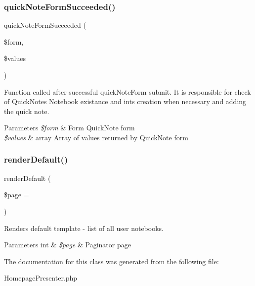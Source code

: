 \subsubsection{\texorpdfstring{quick\+Note\+Form\+Succeeded()}{quickNoteFormSucceeded()}}
{\footnotesize\ttfamily quick\+Note\+Form\+Succeeded (\begin{DoxyParamCaption}\item[{}]{\$form,  }\item[{}]{\$values }\end{DoxyParamCaption})}

Function called after successful quick\+Note\+Form submit. It is responsible for check of Quick\+Notes Notebook existance and int\textquotesingle{}s creation when necessary and adding the quick note.


\begin{DoxyParams}{Parameters}
{\em \$form} & Form Quick\+Note form \\
\hline
{\em \$values} & array Array of values returned by Quick\+Note form \\
\hline
\end{DoxyParams}
\mbox{\label{class_app_1_1_presenters_1_1_homepage_presenter_a7824b03de268f5968857a8ea1b23abe0}} 
\subsubsection{\texorpdfstring{render\+Default()}{renderDefault()}}
{\footnotesize\ttfamily render\+Default (\begin{DoxyParamCaption}\item[{}]{\$page = {} }\end{DoxyParamCaption})}

Renders default template -\/ list of all user notebooks.


\begin{DoxyParams}[1]{Parameters}
int & {\em \$page} & Paginator page \\
\hline
\end{DoxyParams}


The documentation for this class was generated from the following file\+:\begin{DoxyCompactItemize}
\item 
Homepage\+Presenter.\+php\end{DoxyCompactItemize}
